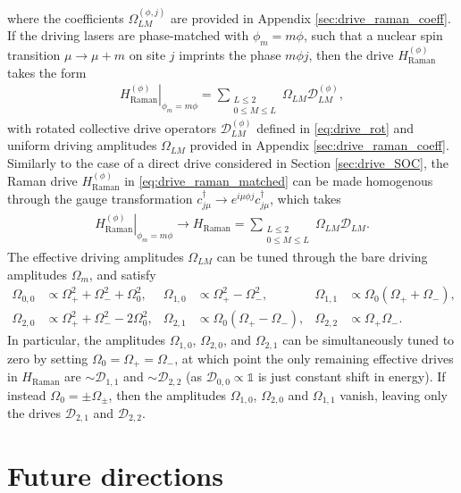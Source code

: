 \documentclass[nofootinbib,notitlepage,11pt]{revtex4-2}
\renewcommand{\t}{\text} %
\newcommand{\p}[1]{\left(#1\right)} %
\newcommand{\1}{\mathds{1}}
\newcommand{\D}{\mathcal{D}}
\begin{document}
where the coefficients $\Omega_{LM}^{(\phi,j)}$ are provided in
Appendix \ref{sec:drive_raman_coeff}.  If the driving lasers are
phase-matched with $\phi_m=m\phi$, such that a nuclear spin transition
$\mu\to\mu+m$ on site $j$ imprints the phase $m\phi j$, then the drive
$H_{\t{Raman}}^{(\phi)}$ takes the form
\begin{align}
  \left. H_{\t{Raman}}^{(\phi)} \right|_{\phi_m=m\phi}
  = \sum_{\substack{L\le2\\0\le M\le L}}
  \Omega_{LM} \D_{LM}^{(\phi)},
  \label{eq:drive_raman_matched}
\end{align}
with rotated collective drive operators $\D_{LM}^{(\phi)}$ defined in
\eqref{eq:drive_rot} and uniform driving amplitudes $\Omega_{LM}$
provided in Appendix \ref{sec:drive_raman_coeff}.  Similarly to the
case of a direct drive considered in Section \ref{sec:drive_SOC}, the
Raman drive $H_{\t{Raman}}^{(\phi)}$ in \eqref{eq:drive_raman_matched}
can be made homogenous through the gauge transformation
$c_{j\mu}^\dag \to e^{i\mu\phi j} c_{j\mu}^\dag$, which takes
\begin{align}
  \left. H_{\t{Raman}}^{(\phi)} \right|_{\phi_m=m\phi}
  \to H_{\t{Raman}}
  = \sum_{\substack{L\le2\\0\le M\le L}} \Omega_{LM} \D_{LM}.
\end{align}
The effective driving amplitudes $\Omega_{LM}$ can be tuned through
the bare driving amplitudes $\Omega_m$, and satisfy
\begin{align}
  \Omega_{0,0} &\propto \Omega_+^2 + \Omega_-^2 + \Omega_0^2,
  &
  \Omega_{1,0} &\propto \Omega_+^2 - \Omega_-^2,
  &
  \Omega_{1,1} &\propto \Omega_0 \p{\Omega_+ + \Omega_-}, \\
  \Omega_{2,0} &\propto \Omega_+^2 + \Omega_-^2 - 2\Omega_0^2,
  &
  \Omega_{2,1} &\propto \Omega_0 \p{\Omega_+ - \Omega_-},
  &
  \Omega_{2,2} &\propto \Omega_+ \Omega_-.
\end{align}
In particular, the amplitudes $\Omega_{1,0}$, $\Omega_{2,0}$, and
$\Omega_{2,1}$ can be simultaneously tuned to zero by setting
$\Omega_0=\Omega_+=\Omega_-$, at which point the only remaining
effective drives in $H_{\t{Raman}}$ are $\sim\D_{1,1}$ and
$\sim\D_{2,2}$ (as $\D_{0,0}\propto\1$ is just constant shift in
energy).  If instead $\Omega_0=\pm\Omega_\pm$, then the amplitudes
$\Omega_{1,0}$, $\Omega_{2,0}$ and $\Omega_{1,1}$ vanish, leaving only
the drives $\D_{2,1}$ and $\D_{2,2}$.

\section{Future directions}
\end{document}

